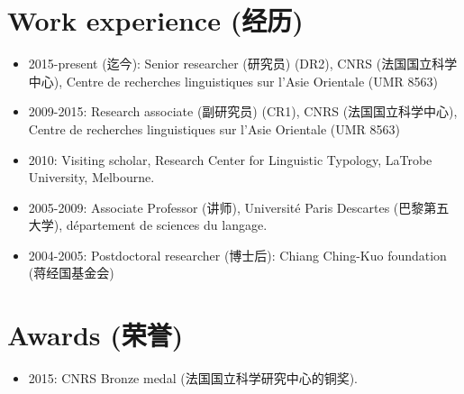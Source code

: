 \documentclass[oldfontcommands,oneside,a4paper,11pt]{article}
\newcommand{\zh}[1]{{\cn #1}}
\newcommand{\lingua}[3]{#2 (\zh{#3})}
\begin{document}
\section*{\lingua{Situation professionnelle}{Work experience}{经历}}
\begin{itemize}
\item 2015-\lingua{présent}{present}{迄今}: \lingua{Directeur de recherches}{Senior researcher}{研究员} (DR2), \lingua{CNRS}{CNRS}{法国国立科学中心}, Centre de recherches linguistiques sur l'Asie Orientale (UMR 8563)
\item 2009-2015: \lingua{Chargé de recherche au CNRS}{Research associate}{副研究员} (CR1), \lingua{CNRS}{CNRS}{法国国立科学中心}, Centre de recherches linguistiques sur l'Asie Orientale (UMR 8563)
\item 2010: Visiting scholar, Research Center for Linguistic Typology, LaTrobe University, Melbourne.
\item 2005-2009: \lingua{Maître de conférences}{Associate Professor}{讲师}, \lingua{Université Paris Descartes}{Université Paris Descartes}{巴黎第五大学}, département de sciences du langage.
\item 2004-2005: \lingua{Postdoctorant}{Postdoctoral researcher}{博士后}: \lingua{Fondation Chiang Ching-Kuo}{Chiang Ching-Kuo foundation}{蒋经国基金会}
\end{itemize}


\section*{\lingua{Prix}{Awards}{荣誉}}  
\begin{itemize}
\item 2015: \lingua{Médaille de bronze du CNRS (section 34)}{CNRS Bronze medal}{法国国立科学研究中心的铜奖}.
\end{itemize}
\end{document}
